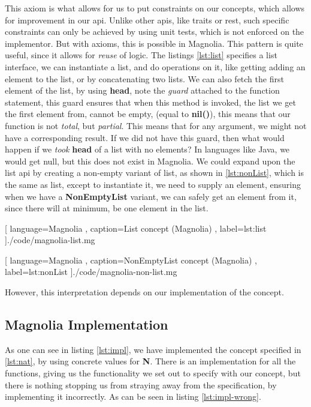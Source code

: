 This axiom is what allows for us to put constraints on our concepts, which
allows for improvement in our \gls{api}. Unlike other \gls{api}s, like traits or
\gls{rest}, such specific constraints can only be achieved by using unit tests,
which is not enforced on the implementor. But with axioms, this is possible in
Magnolia. This pattern is quite useful, since it allows for \textit{reuse} of
logic. The listings \ref{lst:list} specifies a list interface, we can
instantiate a list, and do operations on it, like getting adding an element to
the list, or by concatenating two lists. We can also fetch the first element of
the list, by using \textbf{head}, note the \textit{guard} attached to the
function statement, this guard ensures that when this method is invoked, the
list we get the first element from, cannot be empty, (equal to \textbf{nil()}),
this means that our function is not \textit{total}, but \textit{partial}. This
means that for any argument, we might not have a corresponding result. If we did
not have this guard, then what would happen if we \textit{took} \textbf{head} of a list
with no elements? In languages like Java, we would get null, but this does not
exist in Magnolia. We could expand upon the list \gls{api} by creating a
non-empty variant of list, as shown in \ref{lst:nonList}, which is the same as
list, except to instantiate it, we need to supply an element, ensuring when we
have a \textbf{NonEmptyList} variant, we can safely get an element from it,
since there will at minimum, be one element in the list.

\begin{center}
  
    [ language=Magnolia
    , caption={List concept (Magnolia)}
    , label=lst:list
    ]{./code/magnolia-list.mg}
\end{center}

\begin{center}
  
    [ language=Magnolia
    , caption={NonEmptyList concept (Magnolia)}
    , label=lst:nonList
    ]{./code/magnolia-non-list.mg}
\end{center}

However, this interpretation depends on our implementation of the concept.

\subsection{Magnolia Implementation}

As one can see in listing \ref{lst:impl}, we have implemented the concept
specified in \ref{lst:nat}, by using concrete values for \textbf{N}. There is an
implementation for all the functions, giving us the functionality we set out to
specify with our concept, but there is nothing stopping us from straying away
from the specification, by implementing it incorrectly. As can be seen in
listing \ref{lst:impl-wrong}.

